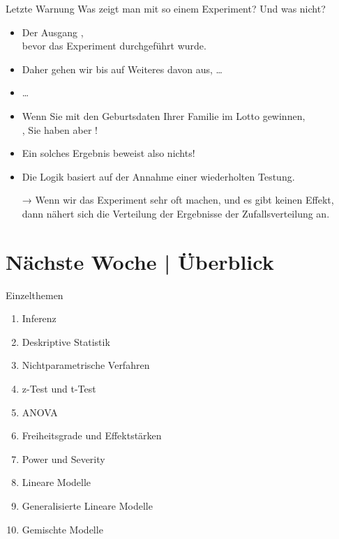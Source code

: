 \begin{frame}
  {Letzte Warnung}
  Was zeigt man mit so einem Experiment? Und was nicht?\\
  \Zeile
  \begin{itemize}[<+->]
    \item Der Ausgang  ,\\
      bevor das Experiment durchgeführt wurde.
    \item Daher gehen wir bis auf Weiteres davon aus,  \ldots
    \item \ldots\ 
      \Halbzeile
    \item Wenn Sie mit den Geburtsdaten Ihrer Familie im Lotto gewinnen,\\
      , Sie haben aber !
      \Halbzeile
    \item \alert{Ein solches Ergebnis beweist also nichts!}
    \item Die Logik basiert auf der Annahme einer wiederholten Testung.
    \item[→] Wenn wir das Experiment \alert{sehr oft} machen, und es gibt \alert{keinen Effekt},\\
      dann nähert sich die \alert{Verteilung der Ergebnisse der Zufallsverteilung} an.
  \end{itemize}
\end{frame}

\ifdefined\TITLE
  \section{Nächste Woche | Überblick}
  \begin{frame}
    {Einzelthemen}
    \begin{enumerate}
      \item Inferenz 
      \item \alert{Deskriptive Statistik}
      \item Nichtparametrische Verfahren
      \item z-Test und t-Test
      \item ANOVA
      \item Freiheitsgrade und Effektstärken
      \item Power und Severity
      \item Lineare Modelle
      \item Generalisierte Lineare Modelle
      \item Gemischte Modelle
    \end{enumerate}
  \end{frame}
\fi


